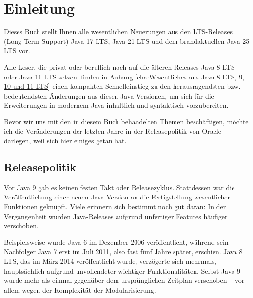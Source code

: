 
\chapter{Einleitung}


Dieses Buch stellt Ihnen alle wesentlichen Neuerungen aus den LTS-Releases
(Long Term Support)
Java 17 LTS, Java 21 LTS und dem brandaktuellen Java 25 LTS vor.

Alle Leser, die privat oder beruflich noch auf die älteren Releases Java
8 LTS oder Java 11 LTS setzen, finden in Anhang \ref{cha:Wesentliches aus Java 8
LTS, 9, 10 und 11 LTS} einen kompakten Schnelleinstieg zu den heraus\-ragendsten bzw.
bedeutendsten Änderungen aus diesen Java-Versionen, um sich für die
Erweiterungen in modernem Java inhaltlich und syntaktisch vorzubereiten.

Bevor wir uns mit den in diesem Buch behandelten Themen beschäftigen,
möchte ich die Veränderungen der letzten Jahre in der Releasepolitik von Oracle
darlegen, weil sich hier einiges getan hat.




\section{Releasepolitik}

Vor Java 9 gab es keinen festen Takt oder Releasezyklus.
Stattdessen war die Veröffentlichung einer neuen Java-Version an die Fertigstellung
wesentlicher Funktionen geknüpft. Viele erinnern sich bestimmt noch gut daran:
 In der Vergangenheit wurden Java-Releases aufgrund unfertiger Features häufiger verschoben.

Beispielsweise wurde Java 6 im Dezember 2006 veröffentlicht, während sein Nachfolger Java 7
erst im Juli 2011, also fast fünf Jahre später, erschien. Java 8 LTS, das im März 2014 veröffentlicht
wurde, verzögerte sich mehrmals, hauptsächlich aufgrund unvollendeter wichtiger Funktionalitäten.
Selbst Java 9 wurde mehr als einmal gegenüber dem ursprünglichen Zeitplan verschoben --
vor allem wegen der Komplexität der Modularisierung.

